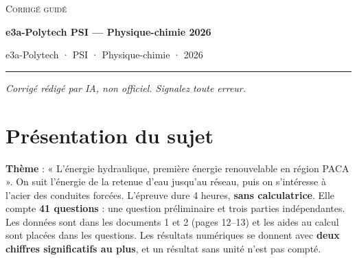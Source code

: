 \documentclass[11pt,a4paper]{article}
\begin{document}
\thispagestyle{plain}
\begin{center}
  {\small\scshape Corrigé guidé}\par\smallskip
  {\LARGE\bfseries e3a-Polytech PSI — Physique-chimie 2026\par}\medskip
  {\large e3a-Polytech · PSI · Physique-chimie · 2026\par}
\end{center}
\vspace{2pt}\hrule\vspace{8pt}

\emph{Corrigé rédigé par IA, non officiel. Signalez toute erreur.}

\hypertarget{pruxe9sentation-du-sujet}{%
\section{Présentation du sujet}\label{pruxe9sentation-du-sujet}}

\textbf{Thème} : « L'énergie hydraulique, première énergie renouvelable en région PACA ». On suit l'énergie de la retenue d'eau jusqu'au réseau, puis on s'intéresse à l'acier des conduites forcées. L'épreuve dure 4 heures, \textbf{sans calculatrice}. Elle compte \textbf{41 questions} : une question préliminaire et trois parties indépendantes. Les données sont dans les documents 1 et 2 (pages 12--13) et les aides au calcul sont placées dans les questions. Les résultats numériques se donnent avec \textbf{deux chiffres significatifs au plus}, et un résultat sans unité n'est pas compté.
\end{document}
